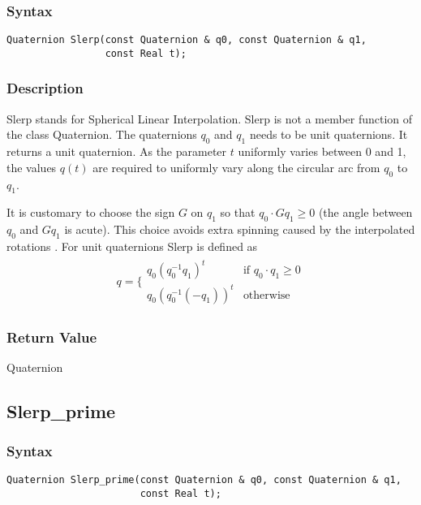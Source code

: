 \documentclass[11pt,fleqn,letterpaper]{report}
\begin{document}
\subsubsection*{Syntax}
\begin{verbatim}
Quaternion Slerp(const Quaternion & q0, const Quaternion & q1, 
                 const Real t);
\end{verbatim}
\subsubsection{Description}
Slerp stands for Spherical Linear Interpolation.  Slerp is not a
member function of the class Quaternion.  The quaternions $q_0$ and
$q_1$ needs to be unit quaternions.  It returns a unit quaternion. As
the parameter $t$ uniformly varies between 0 and 1, the values $q(t)$
are required to uniformly vary along the circular arc from $q_0$ to
$q_1$.

It is customary to choose the sign $G$ on $q_1$ so that $q_0 \cdot
Gq_1 \geq 0$ (the angle between $q_0$ and $Gq_1$ is acute). This
choice avoids extra spinning caused by the interpolated rotations
\cite{Dam98}. For unit quaternions Slerp is defined as
\begin{eqnarray}
 q = \Bigg\{
  \begin{array}{cc}
    q_0(q_0^{-1}q_1)^t & \textrm{if $q_0 \cdot q_1 \geq 0$} \\
    q_0(q_0^{-1}(-q_1))^t & \textrm{otherwise} 
  \end{array}
\end{eqnarray}


\subsubsection*{Return Value}

Quaternion

\newpage

\subsection*{Slerp\_prime}

\subsubsection*{Syntax}
\begin{verbatim}
Quaternion Slerp_prime(const Quaternion & q0, const Quaternion & q1, 
                       const Real t);
\end{verbatim}
\end{document}
